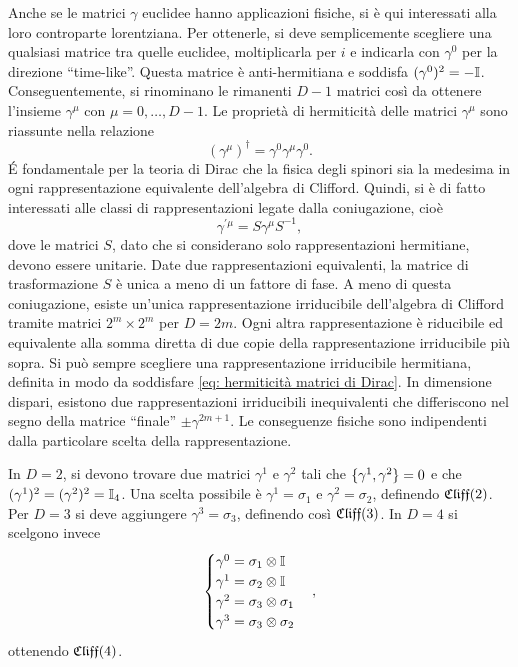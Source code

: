 Anche se le matrici $\gamma$ euclidee hanno applicazioni fisiche, si è qui interessati alla loro controparte lorentziana. Per ottenerle, si deve semplicemente scegliere una qualsiasi matrice tra quelle euclidee, moltiplicarla per $i$ e indicarla con $\gamma^0$ per la direzione ``time-like''. Questa matrice è anti-hermitiana e soddisfa $(\gamma^0)^2 = -\mathbb{I}$. Conseguentemente, si rinominano le rimanenti $D - 1$ matrici così da ottenere l'insieme $\gamma^\mu$ con $\mu = 0,\dots, D - 1$. Le proprietà di hermiticità delle matrici $\gamma^\mu$ sono riassunte nella relazione 
\begin{equation}
\label{eq: hermiticità matrici di Dirac}
    (\gamma^\mu)^\dag = \gamma^0\gamma^\mu\gamma^0.
\end{equation}
\'E fondamentale per la teoria di Dirac che la fisica degli spinori sia la medesima in ogni rappresentazione equivalente dell'algebra di Clifford. Quindi, si è di fatto interessati alle classi di rappresentazioni legate dalla coniugazione, cioè
\begin{equation}
\label{eq: matrici gamma legate da coniugazione}
    \gamma^{\prime\mu} = S\gamma^\mu S^{-1},
\end{equation}
dove le matrici $S$, dato che si considerano solo rappresentazioni hermitiane, devono essere unitarie. Date due rappresentazioni equivalenti, la matrice di trasformazione $S$ è unica a meno di un fattore di fase. A meno di questa coniugazione, esiste un'unica rappresentazione irriducibile dell'algebra di Clifford tramite matrici $2^m \times 2^m$ per $D = 2m$. Ogni altra rappresentazione è riducibile ed equivalente alla somma diretta di due copie della rappresentazione irriducibile più sopra. Si può sempre scegliere una rappresentazione irriducibile hermitiana, definita in modo da soddisfare \eqref{eq: hermiticità matrici di Dirac}. In dimensione dispari, esistono due rappresentazioni irriducibili inequivalenti che differiscono nel segno della matrice ``finale'' $\pm \gamma^{2m + 1}$. Le conseguenze fisiche sono indipendenti dalla particolare scelta della rappresentazione. 
\begin{ex}[matrici di Dirac in $D = 2,3,4$]
    In $D = 2$, si devono trovare due matrici $\gamma^1$ e $\gamma^2$ tali che $\{\gamma^1,\gamma^2\} = 0$ e che $(\gamma^1)^2 = (\gamma^2)^2 = \mathbb{I}_4$. Una scelta possibile è $\gamma^1 = \sigma_1$ e $\gamma^2 = \sigma_2$, definendo $\mathfrak{Cliff}(2)$. Per $D = 3$ si deve aggiungere $\gamma^3 = \sigma_3$, definendo così $\mathfrak{Cliff}(3)$. In $D = 4$ si scelgono invece
    \begin{equation}
        \begin{cases}
            \gamma^0 = \sigma_1 \otimes \mathbb{I} \\
            \gamma^1 = \sigma_2 \otimes \mathbb{I} \\
            \gamma^2 = \sigma_3 \otimes \sigma_1 \\
            \gamma^3 = \sigma_3 \otimes \sigma_2
        \end{cases},
    \end{equation}
    ottenendo $\mathfrak{Cliff}(4)$. 
\end{ex}
